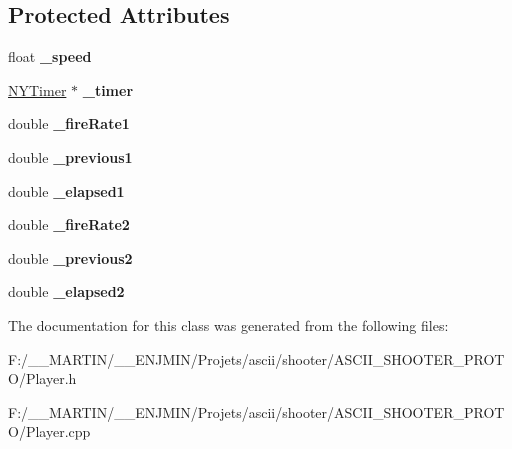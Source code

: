 \subsection*{Protected Attributes}
\begin{DoxyCompactItemize}
\item 
\hypertarget{class_player_a2058005a9cb8d0ee1930178ab5965ac1}{}\label{class_player_a2058005a9cb8d0ee1930178ab5965ac1} 
float {\bfseries \+\_\+speed}
\item 
\hypertarget{class_player_ac242a65fa0bd42e9eb38782c214eb616}{}\label{class_player_ac242a65fa0bd42e9eb38782c214eb616} 
\hyperlink{class_n_y_timer}{N\+Y\+Timer} $\ast$ {\bfseries \+\_\+timer}
\item 
\hypertarget{class_player_a275c2f72e87a8adbac297ff39171a29f}{}\label{class_player_a275c2f72e87a8adbac297ff39171a29f} 
double {\bfseries \+\_\+fire\+Rate1}
\item 
\hypertarget{class_player_aee9448eeba5e2c13c69d7c02846027f6}{}\label{class_player_aee9448eeba5e2c13c69d7c02846027f6} 
double {\bfseries \+\_\+previous1}
\item 
\hypertarget{class_player_a2d253a3b9a3cfed734009bc9f0e279e7}{}\label{class_player_a2d253a3b9a3cfed734009bc9f0e279e7} 
double {\bfseries \+\_\+elapsed1}
\item 
\hypertarget{class_player_a5da7f87d45d122ce555a96848a60df91}{}\label{class_player_a5da7f87d45d122ce555a96848a60df91} 
double {\bfseries \+\_\+fire\+Rate2}
\item 
\hypertarget{class_player_aff92a376478133301307cf8701ac8281}{}\label{class_player_aff92a376478133301307cf8701ac8281} 
double {\bfseries \+\_\+previous2}
\item 
\hypertarget{class_player_a407fc2edf69c09187c1f2b9ac1bb9310}{}\label{class_player_a407fc2edf69c09187c1f2b9ac1bb9310} 
double {\bfseries \+\_\+elapsed2}
\end{DoxyCompactItemize}


The documentation for this class was generated from the following files\+:\begin{DoxyCompactItemize}
\item 
F\+:/\+\_\+\+\_\+\+M\+A\+R\+T\+I\+N/\+\_\+\+\_\+\+E\+N\+J\+M\+I\+N/\+Projets/ascii/shooter/\+A\+S\+C\+I\+I\+\_\+\+S\+H\+O\+O\+T\+E\+R\+\_\+\+P\+R\+O\+T\+O/Player.\+h\item 
F\+:/\+\_\+\+\_\+\+M\+A\+R\+T\+I\+N/\+\_\+\+\_\+\+E\+N\+J\+M\+I\+N/\+Projets/ascii/shooter/\+A\+S\+C\+I\+I\+\_\+\+S\+H\+O\+O\+T\+E\+R\+\_\+\+P\+R\+O\+T\+O/Player.\+cpp\end{DoxyCompactItemize}
